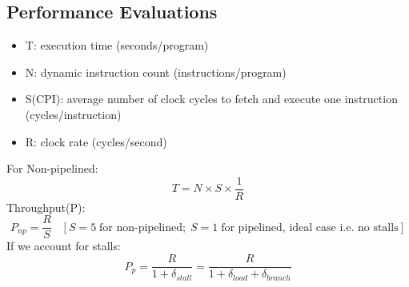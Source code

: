 \documentclass[10pt]{article}
\begin{document}
\subsection{Performance Evaluations}
\begin{itemize}
    \item T: execution time (seconds/program)
    \item N: dynamic instruction count (instructions/program)
    \item S(CPI): average number of clock cycles to fetch and execute one instruction (cycles/instruction)
    \item R: clock rate (cycles/second)
\end{itemize}
For Non-pipelined:
    $$T = N \times S \times \frac{1}{R}$$
Throughput(P):
    $$P_{np} = \frac{R}{S}\;\;\; [S = 5\;\text{for non-pipelined};\; S = 1\;\text{for pipelined, ideal case i.e. no stalls}]$$
If we account for stalls:
$$P_p = \frac{R}{1 + \delta_{stall}} = \frac{R}{1 + \delta_{load} + \delta_{branch}}$$
\end{document}
